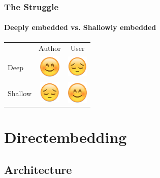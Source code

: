 \documentclass[xcolor=dvipsnames]{beamer}
\theoremstyle{definition}
\begin{document}
\begin{frame}[fragile]
    \frametitle{The Struggle}
    \framesubtitle{Deeply embedded vs. Shallowly embedded}
    \huge
    \begin{center}
        \begin{tabular}{lcc}
                    & Author & User   \\
            Deep    &   \includegraphics[width=1cm]{img/happy.png}   & \includegraphics[width=1cm]{img/sad.png}    \\
            Shallow &   \includegraphics[width=1cm]{img/sad.png}     & \includegraphics[width=1cm]{img/happy.png}  \\
        \end{tabular}
    \end{center}
\end{frame}


\section{Directembedding} %
\label{sec:Directembedding}

\subsection{Architecture} %
\label{sub:Architecture}
\end{document}
